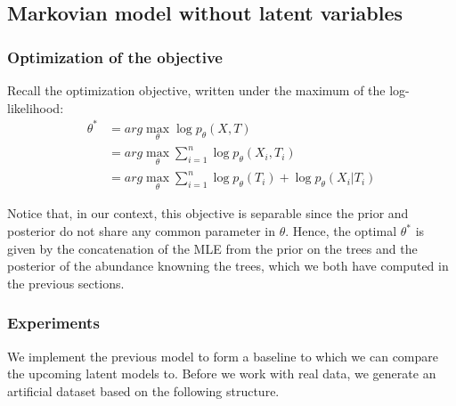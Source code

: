 \subsection{Markovian model without latent variables} \label{simple_generative_model}





\subsubsection{Optimization of the objective}

Recall the optimization objective, written under the maximum of the log-likelihood:
$$
\begin{align}
    \theta^* &= arg \max_{\theta} \log p_{\theta}(X,T) \\
            &= arg \max_{\theta} \sum_{i=1}^n \log p_{\theta}(X_i, T_i) \\
            &= arg \max_{\theta} \sum_{i=1}^n \log p_{\theta}(T_i) + \log p_{\theta}(X_i | T_i)
\end{align}
$$

Notice that, in our context, this objective is separable since the prior and posterior do not share any common parameter in $\theta$.
Hence, the optimal $\theta^*$ is given by the concatenation of the MLE from the prior on the trees and the posterior of the abundance knowning the trees,
which we both have computed in the previous sections.

\subsubsection{Experiments}

We implement the previous model to form a baseline to which we can compare the upcoming latent models to.
Before we work with real data, we generate an artificial dataset based on the following structure.

